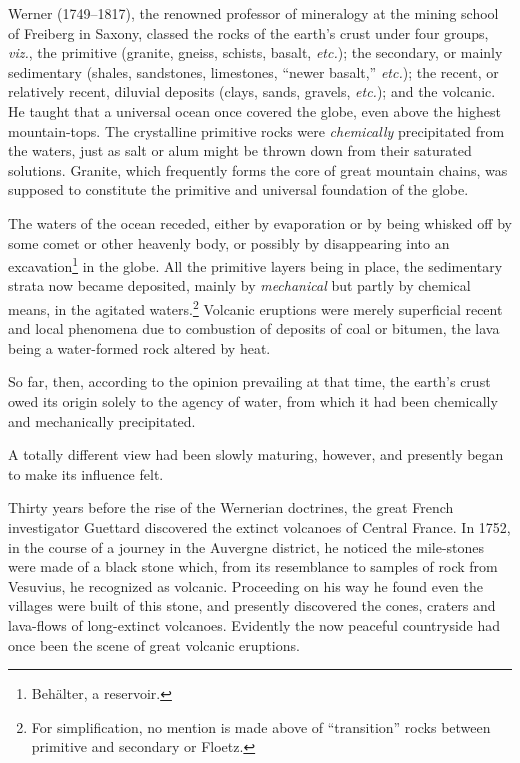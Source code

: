 \documentclass[a4paper, 12pt, oneside]{article}
\begin{document}
Werner (1749--1817), the renowned professor of mineralogy at the mining school of Freiberg in Saxony, classed the rocks of the earth's crust under four groups, \emph{viz.}, the primitive (granite, gneiss, schists, basalt, \emph{etc.}); the secondary, or mainly sedimentary (shales, sandstones, limestones, ``newer basalt,'' \emph{etc.}); the recent, or relatively recent, diluvial deposits (clays, sands, gravels, \emph{etc.}); and the volcanic. He taught that a universal ocean once covered the globe, even above the highest mountain-tops. The crystalline primitive rocks were \emph{chemically} precipitated from the waters, just as salt or alum might be thrown down from their saturated solutions. Granite, which frequently forms the core of great mountain chains, was supposed to constitute the primitive and universal foundation of the globe.

The waters of the ocean receded, either by evaporation or by being whisked off by some comet or other heavenly body, or possibly by disappearing into an excavation\footnote{Behälter, a reservoir.} in the globe. All the primitive layers being in place, the sedimentary strata now became deposited, mainly by \emph{mechanical} but partly by chemical means, in the agitated waters.\footnote{For simplification, no mention is made above of ``transition'' rocks between primitive and secondary or Floetz.} Volcanic eruptions were merely superficial recent and local phenomena due to combustion of deposits of coal or bitumen, the lava being a water-formed rock altered by heat.

So far, then, according to the opinion prevailing at that time, the earth's crust owed its origin solely to the agency of water, from which it had been chemically and mechanically precipitated.

A totally different view had been slowly maturing, however, and presently began to make its influence felt.

Thirty years before the rise of the Wernerian doctrines, the great French investigator Guettard discovered the extinct volcanoes of Central France. In 1752, in the course of a journey in the Auvergne district, he noticed the mile-stones were made of a black stone which, from its resemblance to samples of rock from Vesuvius, he recognized as volcanic. Proceeding on his way he found even the villages were built of this stone, and presently discovered the cones, craters and lava-flows of long-extinct volcanoes. Evidently the now peaceful countryside had once been the scene of great volcanic eruptions.
\end{document}
